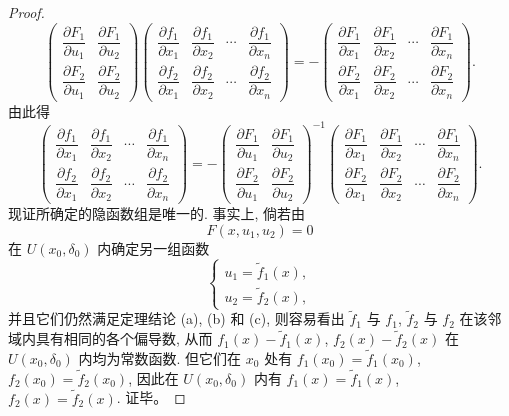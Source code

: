 \documentclass[12pt,fontset=fandol]{ctexart}
\begin{document}
\begin{proof}
\[
  \begin{pmatrix}
    \dfrac{\partial F_1}{\partial u_1} &
    \dfrac{\partial F_1}{\partial u_2}\\
    \dfrac{\partial F_2}{\partial u_1} &
    \dfrac{\partial F_2}{\partial u_2}
  \end{pmatrix}
  \begin{pmatrix}
    \dfrac{\partial f_1}{\partial x_1} &
    \dfrac{\partial f_1}{\partial x_2} &
    \cdots &
    \dfrac{\partial f_1}{\partial x_n}\\
    \dfrac{\partial f_2}{\partial x_1} &
    \dfrac{\partial f_2}{\partial x_2} &
    \cdots &
    \dfrac{\partial f_2}{\partial x_n}
  \end{pmatrix}
  =-
  \begin{pmatrix}
    \dfrac{\partial F_1}{\partial x_1} &
    \dfrac{\partial F_1}{\partial x_2} &
    \cdots &
    \dfrac{\partial F_1}{\partial x_n}\\
    \dfrac{\partial F_2}{\partial x_1} &
    \dfrac{\partial F_2}{\partial x_2} &
    \cdots &
    \dfrac{\partial F_2}{\partial x_n}
  \end{pmatrix}.
\]
由此得
\[
  \begin{pmatrix}
    \dfrac{\partial f_1}{\partial x_1} &
    \dfrac{\partial f_1}{\partial x_2} &
    \cdots &
    \dfrac{\partial f_1}{\partial x_n}\\
    \dfrac{\partial f_2}{\partial x_1} &
    \dfrac{\partial f_2}{\partial x_2} &
    \cdots &
    \dfrac{\partial f_2}{\partial x_n}
  \end{pmatrix}
  =-
  \begin{pmatrix}
    \dfrac{\partial F_1}{\partial u_1} &
    \dfrac{\partial F_1}{\partial u_2}\\
    \dfrac{\partial F_2}{\partial u_1} &
    \dfrac{\partial F_2}{\partial u_2}
  \end{pmatrix}^{-1}
  \begin{pmatrix}
    \dfrac{\partial F_1}{\partial x_1} &
    \dfrac{\partial F_1}{\partial x_2} &
    \cdots &
    \dfrac{\partial F_1}{\partial x_n}\\
    \dfrac{\partial F_2}{\partial x_1} &
    \dfrac{\partial F_2}{\partial x_2} &
    \cdots &
    \dfrac{\partial F_2}{\partial x_n}
  \end{pmatrix}.
\]
现证所确定的隐函数组是唯一的. 事实上, 倘若由
\[
  F(x,u_1,u_2)=0
\]
在 $U(x_0,\delta_0)$ 内确定另一组函数
\[
  \begin{cases}
    u_1=\tilde f_1(x),\\
    u_2=\tilde f_2(x),
  \end{cases}
\]
并且它们仍然满足定理结论 (a), (b) 和 (c), 则容易看出 $\tilde f_1$ 与 $f_1$, $\tilde f_2$ 与 $f_2$ 在该邻域内具有相同的各个偏导数, 从而 $f_1(x)-\tilde f_1(x)$, $f_2(x)-\tilde f_2(x)$ 在 $U(x_0,\delta_0)$ 内均为常数函数. 但它们在 $x_0$ 处有 $f_1(x_0)=\tilde f_1(x_0)$, $f_2(x_0)=\tilde f_2(x_0)$, 因此在 $U(x_0,\delta_0)$ 内有 $f_1(x)=\tilde f_1(x)$, $f_2(x)=\tilde f_2(x)$. 证毕。

\end{proof}
\end{document}
